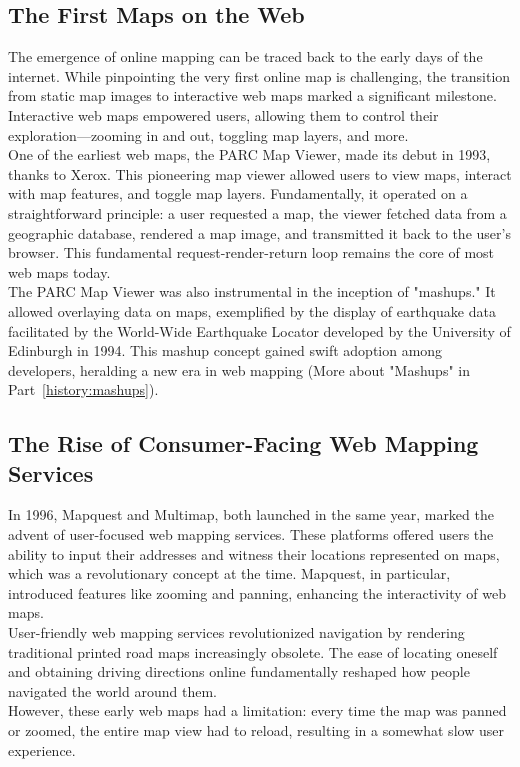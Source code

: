 \documentclass[10pt,oneside,english,a4paper]{article}
\begin{document}
\subsection{The First Maps on the Web} \label{history:firstweb}
The emergence of online mapping can be traced back to the early days of the internet. While pinpointing the very first online map is challenging, the transition from static map images to interactive web maps marked a significant milestone. Interactive web maps empowered users, allowing them to control their exploration—zooming in and out, toggling map layers, and more.
\\One of the earliest web maps, the PARC Map Viewer, made its debut in 1993, thanks to Xerox. This pioneering map viewer allowed users to view maps, interact with map features, and toggle map layers. Fundamentally, it operated on a straightforward principle: a user requested a map, the viewer fetched data from a geographic database, rendered a map image, and transmitted it back to the user's browser. This fundamental request-render-return loop remains the core of most web maps today.
\\The PARC Map Viewer was also instrumental in the inception of "mashups." It allowed overlaying data on maps, exemplified by the display of earthquake data facilitated by the World-Wide Earthquake Locator developed by the University of Edinburgh in 1994. This mashup concept gained swift adoption among developers, heralding a new era in web mapping (More about "Mashups" in Part~\ref{history:mashups}).

\subsection{The Rise of Consumer-Facing Web Mapping Services} \label{history:userfriendly}
In 1996, Mapquest and Multimap, both launched in the same year, marked the advent of user-focused web mapping services. These platforms offered users the ability to input their addresses and witness their locations represented on maps, which was a revolutionary concept at the time. Mapquest, in particular, introduced features like zooming and panning, enhancing the interactivity of web maps.
\\User-friendly web mapping services revolutionized navigation by rendering traditional printed road maps increasingly obsolete. The ease of locating oneself and obtaining driving directions online fundamentally reshaped how people navigated the world around them.
\\However, these early web maps had a limitation: every time the map was panned or zoomed, the entire map view had to reload, resulting in a somewhat slow user experience.
\end{document}
